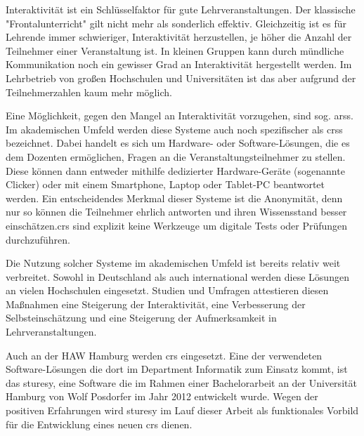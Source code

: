 Interaktivität ist ein Schlüsselfaktor für gute Lehrveranstaltungen. Der klassische "Frontalunterricht" gilt nicht mehr als sonderlich effektiv. Gleichzeitig ist es für Lehrende immer schwieriger, Interaktivität herzustellen, je höher die Anzahl der Teilnehmer einer Veranstaltung ist. In kleinen Gruppen kann durch mündliche Kommunikation noch ein gewisser Grad an Interaktivität hergestellt werden. Im Lehrbetrieb von großen Hochschulen und Universitäten ist das aber aufgrund der Teilnehmerzahlen kaum mehr möglich.

Eine Möglichkeit, gegen den Mangel an Interaktivität vorzugehen, sind sog. \acp{ars}. Im akademischen Umfeld werden diese Systeme auch noch spezifischer als \acp{crs} bezeichnet. Dabei handelt es sich um Hardware- oder Software-Lösungen, die es dem Dozenten ermöglichen, Fragen an die Veranstaltungsteilnehmer zu stellen. Diese können dann entweder mithilfe dedizierter Hardware-Geräte (sogenannte Clicker) oder mit einem Smartphone, Laptop oder Tablet-PC beantwortet werden. Ein entscheidendes Merkmal dieser Systeme ist die Anonymität, denn nur so können die Teilnehmer ehrlich antworten und ihren Wissensstand besser einschätzen.\ac{crs} sind explizit keine Werkzeuge um digitale Tests oder Prüfungen  durchzuführen.

Die Nutzung solcher Systeme im akademischen Umfeld ist bereits relativ weit verbreitet. Sowohl in Deutschland als auch international werden diese Lösungen an vielen Hochschulen eingesetzt. Studien und Umfragen attestieren diesen Maßnahmen eine Steigerung der Interaktivität, eine Verbesserung der Selbsteinschätzung und eine Steigerung der Aufmerksamkeit in Lehrveranstaltungen.\cite{web:wisconsin, web:tenyears}

Auch an der HAW Hamburg werden \ac{crs} eingesetzt. Eine der verwendeten Software-Lösungen die dort im Department Informatik zum Einsatz kommt, ist das \ac{sturesy}, eine Software die im Rahmen einer Bachelorarbeit an der Universität Hamburg von Wolf Posdorfer im Jahr 2012 entwickelt wurde\cite{sturesy}. Wegen der positiven Erfahrungen wird \ac{sturesy}  im Lauf dieser Arbeit als funktionales Vorbild für die Entwicklung eines neuen \ac{crs} dienen.